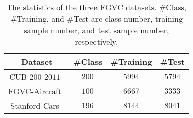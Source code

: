 \documentclass{article}
\begin{document}
\begin{table}[!t]
\vspace{-2.5mm}
    \caption{The statistics of the three FGVC datasets. \#Class, \#Training, and \#Test are class number, training sample number, and test sample number, respectively.}
    \centering
    \begin{tabular}{|c|c|c|c|}
        \hline
        Dataset & \#Class & \#Training & \#Test \\ 
        \hline
        \hline
        CUB-$200$-$2011$~\cite{birds} & $200$ & $5994$ & $5794$  \\ 
        \hline
        FGVC-Aircraft~\cite{air} & $100$ & $6667$ & $3333$ \\
        \hline
        Stanford Cars~\cite{cars} & $196$ & $8144$ & $8041$  \\
        \hline
    \end{tabular}
     \label{tab:datasets}
\end{table}
\end{document}
